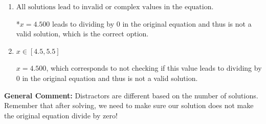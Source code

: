 \documentclass{extbook}[14pt]
\begin{document}
\begin{enumerate}
{\begin{enumerate}[label=\Alph*.]
$x = 4.500 \text{ and } x = 4.500$, which corresponds to getting the correct solution and believing there should be a second solution to the equation.
\item \( \text{All solutions lead to invalid or complex values in the equation.} \)

*$x = 4.500$ leads to dividing by 0 in the original equation and thus is not a valid solution, which is the correct option.
\item \( x \in [4.5,5.5] \)

$x = 4.500$, which corresponds to not checking if this value leads to dividing by 0 in the original equation and thus is not a valid solution.
\end{enumerate}

\textbf{General Comment:} Distractors are different based on the number of solutions. Remember that after solving, we need to make sure our solution does not make the original equation divide by zero!
}
\end{enumerate}
\end{document}
